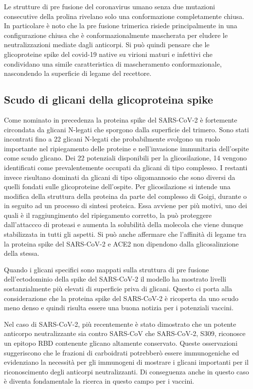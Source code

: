 Le strutture di pre fusione del coronavirus umano senza due mutazioni consecutive della prolina rivelano solo una conformazione completamente chiusa. In particolare è noto che la pre fusione trimerica risiede principalmente in una configurazione chiusa che è conformazionalmente mascherata per eludere le neutralizzazioni mediate dagli anticorpi. Si può quindi pensare che le glicoproteine spike del covid-19 native su virioni maturi e infettivi che condividano una simile caratteristica di mascheramento conformazionale, nascondendo la superficie di legame del recettore.

\subsection{Scudo di glicani della glicoproteina spike}\label{subsec:es_subsec}
Come nominato in precedenza la proteina spike del SARS-CoV-2 è fortemente circondata da glicani N-legati che sporgono dalla superficie del trimero. Sono stati incontrati fino a 22 glicani N-legati che probabilmente svolgono un ruolo importante nel ripiegamento delle proteine e nell'invasione immunitaria dell'ospite come scudo glicano. Dei 22 potenziali disponibili per la glicosilazione, 14 vengono identificati come prevalentemente occupati da glicani di tipo complesso. I restanti invece risultano dominati da glicani di tipo oligomannosio che sono diversi da quelli fondati sulle glicoproteine dell'ospite. Per glicosilazione si intende una modifica della struttura della proteina da parte del complesso di Goigi, durante o in seguito ad un processo di sintesi proteica. Essa avviene per più motivi, uno dei quali è il raggiungimento del ripiegamento corretto, la può proteggere dall'attaccco di proteasi e aumenta la solubilità della molecola che viene dunque stabilizzata in tutti gli aspetti. Si può anche affermare che l'affinità di legame tra la proteina spike del SARS-CoV-2 e ACE2 non dipendono dalla glicosalinzione della stessa.

Quando i glicani specifici sono mappati sulla struttura di pre fusione dell'ectodominio della spike del SARS-CoV-2 il modello ha mostrato livelli sostanzialmente più elevati di superficie priva di glicani. Questo ci porta alla considerazione che la proteina spike del SARS-CoV-2 è ricoperta da uno scudo meno denso e quindi risulta essere una buona notizia per i potenziali vaccini. 

Nel caso di SARS-CoV-2, più recentemente è stato dimostrato che un potente anticorpo neutralizzante sia contro SARS-CoV che SARS-CoV-2, S309, riconosce un epitopo RBD contenente glicano altamente conservato. Queste osservazioni suggeriscono che le frazioni di carboidrati potrebberò essere immunogeniche ed evidenziano la necessità per gli immunogeni di mostrare i glicani importanti per il riconoscimento degli anticorpi neutralizzanti. Di conseguenza anche in questo caso è diventa fondamentale la ricerca in questo campo per i vaccini.


